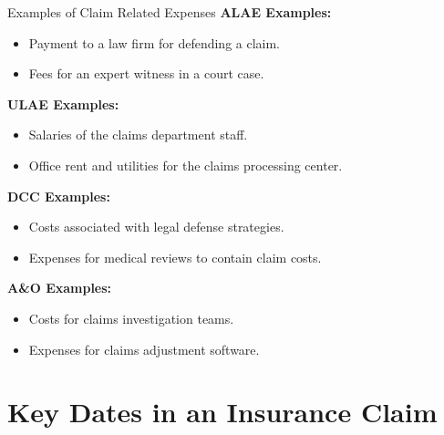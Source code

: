 \documentclass[compress,mathserif]{beamer}
\begin{document}
\begin{frame}{Examples of Claim Related Expenses}
    \textbf{ALAE Examples:}
    \begin{itemize}
        \item Payment to a law firm for defending a claim.
        \item Fees for an expert witness in a court case.
    \end{itemize}

    \textbf{ULAE Examples:}
    \begin{itemize}
        \item Salaries of the claims department staff.
        \item Office rent and utilities for the claims processing center.
    \end{itemize}

    \textbf{DCC Examples:}
    \begin{itemize}
        \item Costs associated with legal defense strategies.
        \item Expenses for medical reviews to contain claim costs.
    \end{itemize}

    \textbf{A\&O Examples:}
    \begin{itemize}
        \item Costs for claims investigation teams.
        \item Expenses for claims adjustment software.
    \end{itemize}
\end{frame}

\section{Key Dates in an Insurance Claim}
\end{document}
